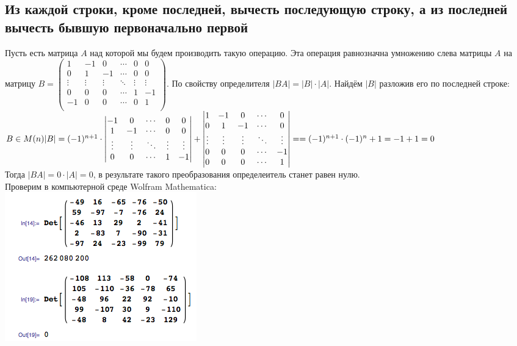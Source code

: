 \subsection{Из каждой строки, кроме последней, вычесть последующую строку, а из последней вычесть бывшую первоначально первой}
Пусть есть матрица $ A $ над которой мы будем производить такую операцию.
Эта операция равнозначна умножению слева матрицы $ A $ на матрицу
$
	B =
	\begin{pmatrix}
		1      & -1     & 0      & \cdots & 0      & 0      \\
		0      & 1      & -1     & \cdots & 0      & 0      \\
		\vdots & \vdots & \vdots & \ddots & \vdots & \vdots \\
		0      & 0      & 0      & \cdots & 1      & -1     \\
		-1     & 0      & 0      & \cdots & 0      & 1      \\
	\end{pmatrix}
$. По свойству определителя $ |BA| = |B| \cdot |A| $. Найдём $ |B| $ разложив его по последней строке:
\\[1em]
$
	B \in M(n)
	\\[1em]
	|B| = (-1)^{n+1} \cdot
	\begin{vmatrix}
		-1     & 0      & \cdots & 0      & 0      \\
		1      & -1     & \cdots & 0      & 0      \\
		\vdots & \vdots & \ddots & \vdots & \vdots \\
		0      & 0      & \cdots & 1      & -1     \\
	\end{vmatrix}
	+
	\begin{vmatrix}
		1      & -1     & 0      & \cdots & 0      \\
		0      & 1      & -1     & \cdots & 0      \\
		\vdots & \vdots & \vdots & \ddots & \vdots \\
		0      & 0      & 0      & \cdots & -1     \\
		0      & 0      & 0      & \cdots & 1      \\
	\end{vmatrix}
	=
	\\[1em]
	=
	(-1)^{n+1} \cdot (-1)^n + 1 = -1 + 1 = 0
$
\\[1em]
Тогда $ |BA| = 0 \cdot |A| = 0 $, в результате такого преобразования определеитель станет равен нулю.
\\[1em]
Проверим в компьютерной среде Wolfram Mathematica:
\\
\includegraphics[scale=0.6]{task/1_38/screen3.png}
